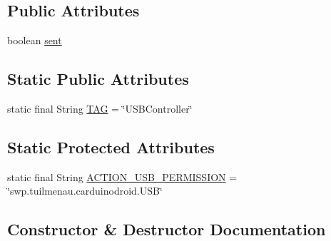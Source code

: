 \subsection*{Public Attributes}
\begin{DoxyCompactItemize}
\item 
boolean \hyperlink{classswp_1_1tuilmenau_1_1carduinodroid_1_1controller_1_1_usb_controller_a18fb1eb53ea4080504f0840671fde0b5}{sent}
\end{DoxyCompactItemize}
\subsection*{Static Public Attributes}
\begin{DoxyCompactItemize}
\item 
static final String \hyperlink{classswp_1_1tuilmenau_1_1carduinodroid_1_1controller_1_1_usb_controller_a7b414960182f31fe2af03326c29e0bf8}{T\+A\+G} = \char`\"{}U\+S\+B\+Controller\char`\"{}
\end{DoxyCompactItemize}
\subsection*{Static Protected Attributes}
\begin{DoxyCompactItemize}
\item 
static final String \hyperlink{classswp_1_1tuilmenau_1_1carduinodroid_1_1controller_1_1_usb_controller_ad2ce11a82a17ea79d48a3e8761b341cc}{A\+C\+T\+I\+O\+N\+\_\+\+U\+S\+B\+\_\+\+P\+E\+R\+M\+I\+S\+S\+I\+O\+N} = \char`\"{}swp.\+tuilmenau.\+carduinodroid.\+U\+S\+B\char`\"{}
\end{DoxyCompactItemize}


\subsection{Constructor \& Destructor Documentation}
\hypertarget{classswp_1_1tuilmenau_1_1carduinodroid_1_1controller_1_1_usb_controller_a49aa06782978ab1150cd4b12598723a4}{}
